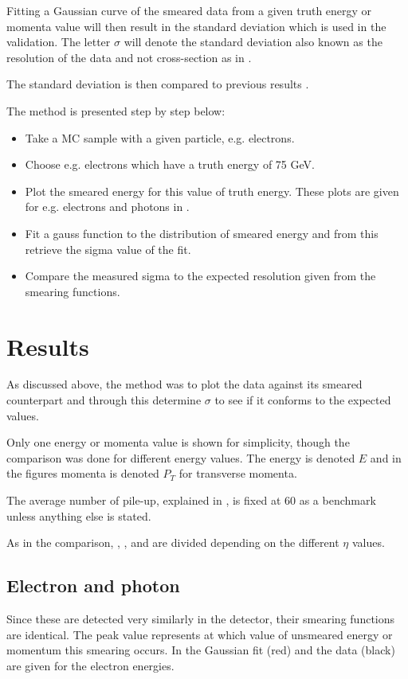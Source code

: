Fitting a Gaussian curve of the smeared data from a given truth energy or momenta value will then result in the standard deviation which is used in the validation. The letter  $\sigma$ will denote the standard deviation also known as the resolution of the data and not cross-section as in .

The standard deviation is then compared to previous results \citep{ATL-PHYS-PUB-2013-004}.

The method is presented step by step below:
\begin{itemize}
\item Take a MC sample with a given particle, e.g. electrons.
\item Choose e.g. electrons which have a truth energy of 75 GeV.
\item Plot the smeared energy for this value of truth energy. These plots are given for e.g. electrons and photons in .
\item Fit a gauss function to the distribution of smeared energy and from this retrieve the sigma value of the fit.
\item Compare the measured sigma to the expected resolution given from the smearing functions.
\end{itemize}

\newpage
\section{Results}\label{cha:vali:sec:results}
As discussed above, the method was to plot the data against its smeared counterpart and through this determine $\sigma$ to see if it conforms to the expected values.

Only one energy or momenta value is shown for simplicity, though the comparison was done for different energy values. The energy is denoted $E$ and in the figures momenta is denoted $P_T$ for transverse momenta.

The average number of pile-up, explained in , is fixed at 60 as a benchmark unless anything else is stated.

As in the comparison, , ,  and  are divided depending on the different $\eta$ values.
\newpage
\subsection{Electron and photon}\label{cha:vali:sec:res:subsec:elph}
Since these are detected very similarly in the detector, their smearing functions are identical.
The peak value represents at which value of unsmeared energy or momentum this smearing occurs. In  the Gaussian fit (red) and the data (black) are given for the electron energies.

